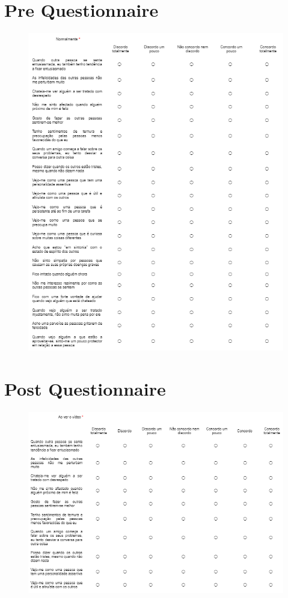 \section{Pre Questionnaire}
\begin{figure}[h!]
\includegraphics[scale=0.45]{figures/pre.png}
\centering
\end{figure}

\clearpage
\section{Post Questionnaire}
\begin{figure}[h!]
\includegraphics[scale=0.45]{figures/post.png}
\centering
\end{figure}
